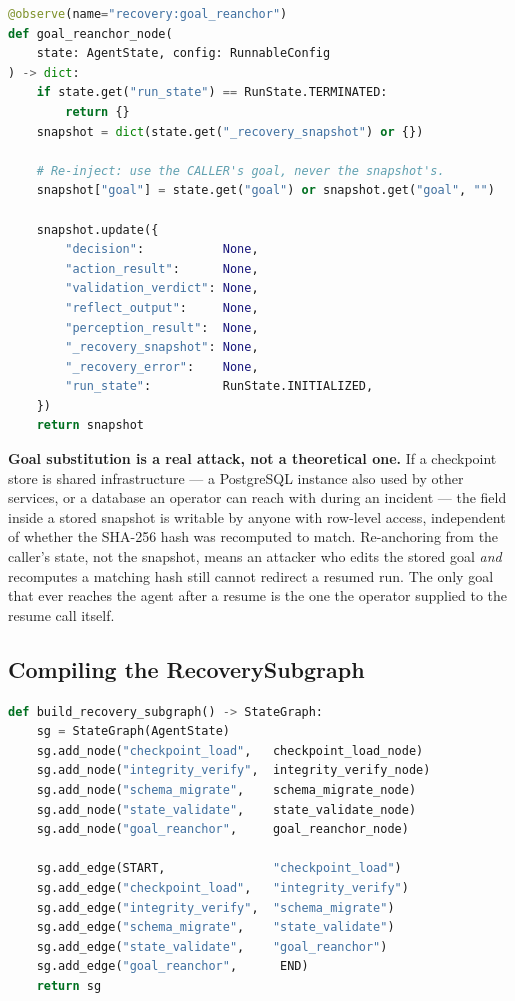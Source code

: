 \begin{lstlisting}[language=Python,
    caption={RecoverySubgraph Stage 5 --- goal re-anchoring
             (src/checkpointing.py)},
    label={lst:recovery-stage5}]
@observe(name="recovery:goal_reanchor")
def goal_reanchor_node(
    state: AgentState, config: RunnableConfig
) -> dict:
    if state.get("run_state") == RunState.TERMINATED:
        return {}
    snapshot = dict(state.get("_recovery_snapshot") or {})

    # Re-inject: use the CALLER's goal, never the snapshot's.
    snapshot["goal"] = state.get("goal") or snapshot.get("goal", "")

    snapshot.update({
        "decision":           None,
        "action_result":      None,
        "validation_verdict": None,
        "reflect_output":     None,
        "perception_result":  None,
        "_recovery_snapshot": None,
        "_recovery_error":    None,
        "run_state":          RunState.INITIALIZED,
    })
    return snapshot
\end{lstlisting}

\begin{warningbox}
\textbf{Goal substitution is a real attack, not a theoretical one.}  If a
checkpoint store is shared infrastructure --- a PostgreSQL instance also
used by other services, or a database an operator can reach with
 during an incident --- the  field inside a stored
snapshot is writable by anyone with row-level access, independent of
whether the SHA-256 hash was recomputed to match.  Re-anchoring from the
caller's state, not the snapshot, means an attacker who edits the stored
goal \emph{and} recomputes a matching hash still cannot redirect a
resumed run.  The only goal that ever reaches the agent after a resume is
the one the operator supplied to the resume call itself.
\end{warningbox}

\subsection{Compiling the RecoverySubgraph}
\label{subsec:recovery-compile}

\begin{lstlisting}[language=Python,
    caption={build\_recovery\_subgraph --- assembly (src/checkpointing.py)},
    label={lst:recovery-compile}]
def build_recovery_subgraph() -> StateGraph:
    sg = StateGraph(AgentState)
    sg.add_node("checkpoint_load",   checkpoint_load_node)
    sg.add_node("integrity_verify",  integrity_verify_node)
    sg.add_node("schema_migrate",    schema_migrate_node)
    sg.add_node("state_validate",    state_validate_node)
    sg.add_node("goal_reanchor",     goal_reanchor_node)

    sg.add_edge(START,               "checkpoint_load")
    sg.add_edge("checkpoint_load",   "integrity_verify")
    sg.add_edge("integrity_verify",  "schema_migrate")
    sg.add_edge("schema_migrate",    "state_validate")
    sg.add_edge("state_validate",    "goal_reanchor")
    sg.add_edge("goal_reanchor",      END)
    return sg
\end{lstlisting}

